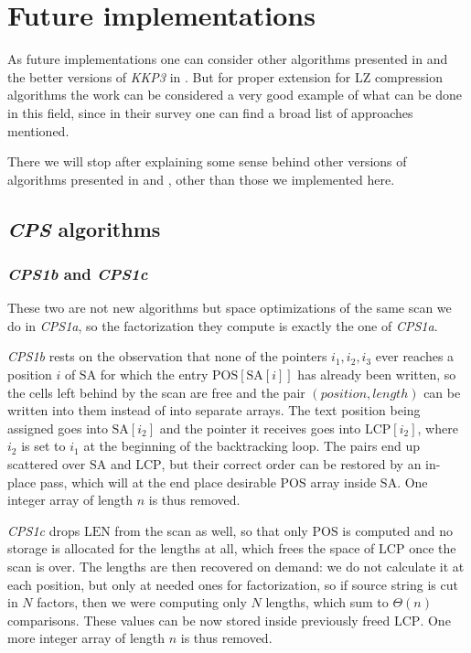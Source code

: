 \chapter{Future implementations}
\label{ch:future}

As future implementations one can consider other algorithms presented in \cite{chen2008} and the better versions of \emph{KKP3} in \cite{kkp2012}. But for proper extension for LZ compression algorithms the work \cite{acm2012} can be considered a very good example of what can be done in this field, since in their survey one can find a broad list of approaches mentioned.

There we will stop after explaining some sense behind other versions of algorithms presented in \cite{chen2008} and \cite{kkp2012}, other than those we implemented here.

\section{\emph{CPS} algorithms}

\subsection{\emph{CPS1b} and \emph{CPS1c}}

These two are not new algorithms but space optimizations of the same scan we do in \emph{CPS1a}, so the factorization they compute is exactly the one of \emph{CPS1a}. 

\emph{CPS1b} rests on the observation that none of the pointers \(i_1, i_2, i_3\) ever reaches a position \(i\) of \(\mathrm{SA}\) for which the entry \(\mathrm{POS}[\mathrm{SA}[i]]\) has already been written, so the cells left behind by the scan are free and the pair \((position, length)\) can be written into them instead of into separate arrays. The text position being assigned goes into \(\mathrm{SA}[i_2]\) and the pointer it receives goes into \(\mathrm{LCP}[i_2]\), where \(i_2\) is set to \(i_1\) at the beginning of the backtracking loop. The pairs end up scattered over \(\mathrm{SA}\) and \(\mathrm{LCP}\), but their correct order can be restored by an in-place pass, which will at the end place desirable \(\mathrm{POS}\) array inside \(\mathrm{SA}\). One integer array of length \(n\) is thus removed.

\emph{CPS1c} drops \(\mathrm{LEN}\) from the scan as well, so that only \(\mathrm{POS}\) is computed and no storage is allocated for the lengths at all, which frees the space of \(\mathrm{LCP}\) once the scan is over. The lengths are then recovered on demand: we do not calculate it at each position, but only at needed ones for factorization, so if source string is cut in \(N\) factors, then we were computing only \(N\) lengths, which sum to \(\Theta(n)\) comparisons. These values can be now stored inside previously freed \(\mathrm{LCP}\). One more integer array of length \(n\) is thus removed. 

